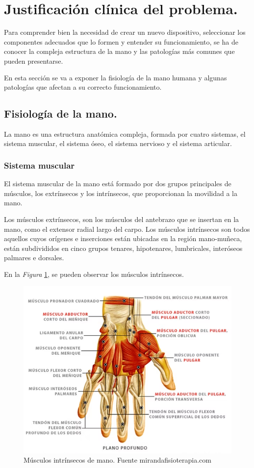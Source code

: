 \section{Justificación clínica del problema.}

Para comprender bien la necesidad de crear un nuevo dispositivo, seleccionar los componentes adecuados que lo formen y entender su funcionamiento, se ha de conocer la compleja estructura de la mano y las patologías más comunes que pueden presentarse. 

En esta sección se va a exponer la fisiología de la mano humana y algunas patologías que afectan a su correcto funcionamiento.
\subsection{Fisiología de la mano.}

La mano es una estructura anatómica compleja, formada por cuatro sistemas, el sistema muscular, el sistema óseo, el sistema nervioso y el sistema articular. 

\subsubsection{Sistema muscular}

El sistema muscular de la mano está formado por dos grupos principales de músculos, los extrínsecos y los intrínsecos, que proporcionan la movilidad a la mano. 

Los músculos extrínsecos, son los músculos del antebrazo que se insertan en la mano, como el extensor radial largo del carpo. Los músculos intrínsecos son todos aquellos cuyos orígenes e inserciones están ubicadas en la región mano-muñeca, están subdivididos en cinco grupos tenares, hipotenares, lumbricales, interóseos palmares e dorsales.\cite{mano_anatomía}

En la \textit{Figura} \ref{fig:Músculos_mano}, se pueden observar los músculos intrínsecos.
\begin{figure}
    \centering
    \includegraphics[width=0.8\linewidth]{img/Musculos_mano.png}
    \caption{Músculos intrínsecos de mano. Fuente mirandafisioterapia.com}
    \label{fig:Músculos_mano}
\end{figure}


